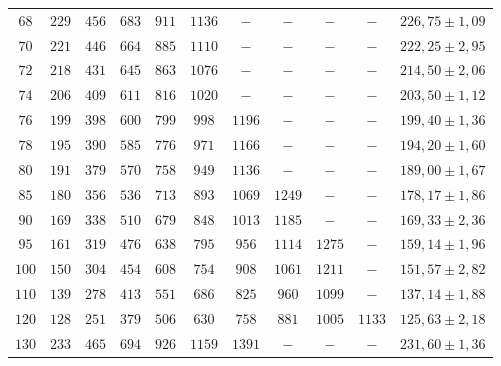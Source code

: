 \begin{table}[H]
\begin{tabular}{c c c c c c c c c c | c}
        $68$ &  $229$ & $456$ &$ 683$  & $911 $ & $1136 $ & $-   $ & $-   $ & $-   $ &  $-   $ &  $ 226,75 \pm 1,09 $ \\
        $70$ &  $221$ & $446$ &$ 664$  & $885 $ & $1110 $ & $-   $ & $-   $ & $-   $ &  $-   $ &  $ 222,25 \pm 2,95 $ \\
        $72$ &  $218$ & $431$ &$ 645$  & $863 $ & $1076 $ & $-   $ & $-   $ & $-   $ &  $-   $ &  $ 214,50 \pm 2,06 $ \\
        $74$ &  $206$ & $409$ &$ 611$  & $816 $ & $1020 $ & $-   $ & $-   $ & $-   $ &  $-   $ &  $ 203,50 \pm 1,12 $ \\
        $76$ &  $199$ & $398$ &$ 600$  & $799 $ & $998  $ & $1196$ & $-   $ & $-   $ &  $-   $ &  $ 199,40 \pm 1,36 $ \\ 
        $78$ &  $195$ & $390$ &$ 585$  & $776 $ & $971  $ & $1166$ & $-   $ & $-   $ &  $-   $ &  $ 194,20 \pm 1,60 $ \\ 
        $80$ &  $191$ & $379$ &$ 570$  & $758 $ & $949  $ & $1136$ & $-   $ & $-   $ &  $-   $ &  $ 189,00 \pm 1,67 $ \\ 
        $85$ &  $180$ & $356$ &$ 536$  & $713 $ & $893  $ & $1069$ & $1249$ & $-   $ &  $-   $ &  $ 178,17 \pm 1,86 $ \\ 
        $90$ &  $169$ & $338$ &$ 510$  & $679 $ & $848  $ & $1013$ & $1185$ & $-   $ &  $-   $ &  $ 169,33 \pm 2,36 $ \\ 
        $95$ &  $161$ & $319$ &$ 476$  & $638 $ & $795  $ & $956 $ & $1114$ & $1275$ &  $-   $ &  $ 159,14 \pm 1,96 $ \\ 
        $100$ & $150$ & $304$ &$ 454$  & $608 $ & $754  $ & $908 $ & $1061$ & $1211$ &  $-   $ &  $ 151,57 \pm 2,82 $ \\ 
        $110$ & $139$ & $278$ &$ 413$  & $551 $ & $686  $ & $825 $ & $960 $ & $1099$ &  $-   $ &  $ 137,14 \pm 1,88 $ \\ 
        $120$ & $128$ & $251$ &$ 379$  & $506 $ & $630  $ & $758 $ & $881 $ & $1005$ &  $1133$ &  $ 125,63 \pm 2,18 $ \\
        $130$ & $233$ & $465$ &$ 694$  & $926 $ & $1159 $ & $1391$ & $-   $ & $-   $ &  $-   $ &  $ 231,60 \pm 1,36 $ \\ 
    \bottomrule
    \end{tabular}
    \end{table}